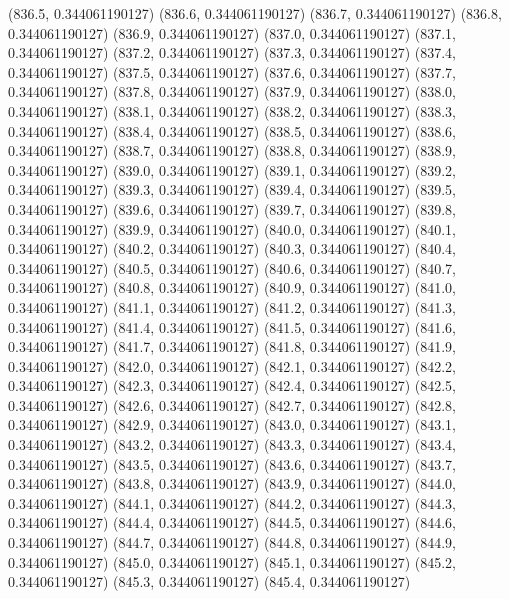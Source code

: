 {					(836.5, 0.344061190127)
					(836.6, 0.344061190127)
					(836.7, 0.344061190127)
					(836.8, 0.344061190127)
					(836.9, 0.344061190127)
					(837.0, 0.344061190127)
					(837.1, 0.344061190127)
					(837.2, 0.344061190127)
					(837.3, 0.344061190127)
					(837.4, 0.344061190127)
					(837.5, 0.344061190127)
					(837.6, 0.344061190127)
					(837.7, 0.344061190127)
					(837.8, 0.344061190127)
					(837.9, 0.344061190127)
					(838.0, 0.344061190127)
					(838.1, 0.344061190127)
					(838.2, 0.344061190127)
					(838.3, 0.344061190127)
					(838.4, 0.344061190127)
					(838.5, 0.344061190127)
					(838.6, 0.344061190127)
					(838.7, 0.344061190127)
					(838.8, 0.344061190127)
					(838.9, 0.344061190127)
					(839.0, 0.344061190127)
					(839.1, 0.344061190127)
					(839.2, 0.344061190127)
					(839.3, 0.344061190127)
					(839.4, 0.344061190127)
					(839.5, 0.344061190127)
					(839.6, 0.344061190127)
					(839.7, 0.344061190127)
					(839.8, 0.344061190127)
					(839.9, 0.344061190127)
					(840.0, 0.344061190127)
					(840.1, 0.344061190127)
					(840.2, 0.344061190127)
					(840.3, 0.344061190127)
					(840.4, 0.344061190127)
					(840.5, 0.344061190127)
					(840.6, 0.344061190127)
					(840.7, 0.344061190127)
					(840.8, 0.344061190127)
					(840.9, 0.344061190127)
					(841.0, 0.344061190127)
					(841.1, 0.344061190127)
					(841.2, 0.344061190127)
					(841.3, 0.344061190127)
					(841.4, 0.344061190127)
					(841.5, 0.344061190127)
					(841.6, 0.344061190127)
					(841.7, 0.344061190127)
					(841.8, 0.344061190127)
					(841.9, 0.344061190127)
					(842.0, 0.344061190127)
					(842.1, 0.344061190127)
					(842.2, 0.344061190127)
					(842.3, 0.344061190127)
					(842.4, 0.344061190127)
					(842.5, 0.344061190127)
					(842.6, 0.344061190127)
					(842.7, 0.344061190127)
					(842.8, 0.344061190127)
					(842.9, 0.344061190127)
					(843.0, 0.344061190127)
					(843.1, 0.344061190127)
					(843.2, 0.344061190127)
					(843.3, 0.344061190127)
					(843.4, 0.344061190127)
					(843.5, 0.344061190127)
					(843.6, 0.344061190127)
					(843.7, 0.344061190127)
					(843.8, 0.344061190127)
					(843.9, 0.344061190127)
					(844.0, 0.344061190127)
					(844.1, 0.344061190127)
					(844.2, 0.344061190127)
					(844.3, 0.344061190127)
					(844.4, 0.344061190127)
					(844.5, 0.344061190127)
					(844.6, 0.344061190127)
					(844.7, 0.344061190127)
					(844.8, 0.344061190127)
					(844.9, 0.344061190127)
					(845.0, 0.344061190127)
					(845.1, 0.344061190127)
					(845.2, 0.344061190127)
					(845.3, 0.344061190127)
					(845.4, 0.344061190127)
}

